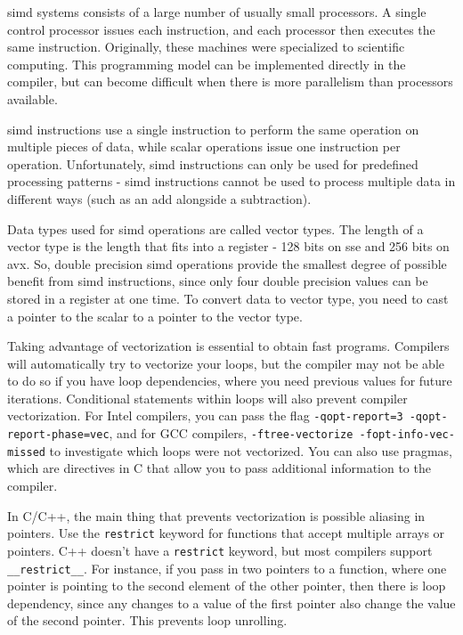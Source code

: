 \documentclass[10pt]{article}
\begin{document}
\begin{flushleft}
\gls{simd} systems consists of a large number of usually small processors. A single control processor issues each instruction, and each processor then executes the same instruction. Originally, these machines were specialized to scientific computing. This programming model can be implemented directly in the compiler, but can become difficult when there is more parallelism than processors available. 

\gls{simd} instructions use a single instruction to perform the same operation on multiple pieces of data, while scalar operations issue one instruction per operation. Unfortunately, \gls{simd} instructions can only be used for predefined processing patterns - \gls{simd} instructions cannot be used to process multiple data in different ways (such as an add alongside a subtraction). 

Data types used for \gls{simd} operations are called vector types. The length of a vector type is the length that fits into a register - 128 bits on \gls{sse} and 256 bits on \gls{avx}. So, double precision \gls{simd} operations provide the smallest degree of possible benefit from \gls{simd} instructions, since only four double precision values can be stored in a register at one time. To convert data to vector type, you need to cast a pointer to the scalar to a pointer to the vector type. 

Taking advantage of vectorization is essential to obtain fast programs. Compilers will automatically try to vectorize your loops, but the compiler may not be able to do so if you have loop dependencies, where you need previous values for future iterations. Conditional statements within loops will also prevent compiler vectorization. For Intel compilers, you can pass the flag {\tt -qopt-report=3 -qopt-report-phase=vec}, and for GCC compilers, {\tt -ftree-vectorize -fopt-info-vec-missed} to investigate which loops were not vectorized. You can also use pragmas, which are directives in C that allow you to pass additional information to the compiler.

In C/C++, the main thing that prevents vectorization is possible aliasing in pointers. Use the {\tt restrict} keyword for functions that accept multiple arrays or pointers. C++ doesn't have a {\tt restrict} keyword, but most compilers support {\tt \_\_restrict\_\_}. For instance, if you pass in two pointers to a function, where one pointer is pointing to the second element of the other pointer, then there is loop dependency, since any changes to a value of the first pointer also change the value of the second pointer. This prevents loop unrolling.


\end{flushleft}
\end{document}
